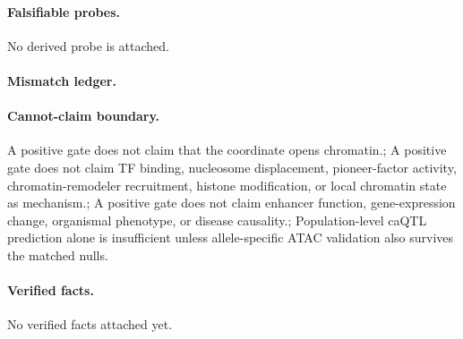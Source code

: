 \paragraph{Falsifiable probes.}
No derived probe is attached.

\paragraph{Mismatch ledger.}
\paragraph{Cannot-claim boundary.} A positive gate does not claim that the coordinate opens chromatin.; A positive gate does not claim TF binding, nucleosome displacement, pioneer-factor activity, chromatin-remodeler recruitment, histone modification, or local chromatin state as mechanism.; A positive gate does not claim enhancer function, gene-expression change, organismal phenotype, or disease causality.; Population-level caQTL prediction alone is insufficient unless allele-specific ATAC validation also survives the matched nulls.

\paragraph{Verified facts.}
No verified facts attached yet.
